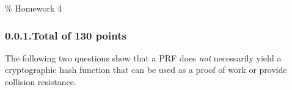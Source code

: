 \documentclass{article}
\begin{document}
\noindent{}\% Homework 4%

\newcommand{\zo}{\{0,1\}}
\newcommand{\E}{\mathbb{E}}
\newcommand{\Z}{\mathbb{Z}}
\newcommand{\getsr}{\leftarrow_R\;}
\subsubsection{0.0.1.\hspace*{0.5em}Total of 130 points}\label{sec-total-of-130-points}%

\noindent{}The following two questions show that a PRF does \emph{not} necessarily yield a cryptographic hash function that can be used as a proof of work or provide collision resistance.%
\end{document}
